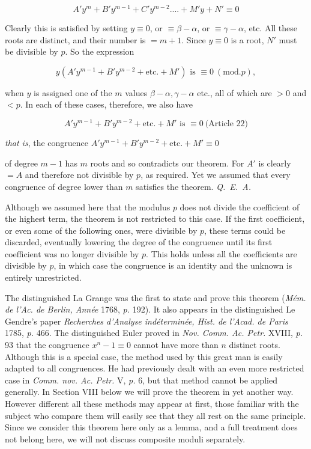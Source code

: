 \[A'y^m+B'y^{m-1}+C'y^{m-2}....+M'y+N'\equiv0\]

Clearly this is satisfied by setting $y\equiv0$, or $\equiv\beta-\alpha$, or $\equiv\gamma-\alpha$, etc. All these roots are distinct, and their number is $=m+1$. Since $y\equiv0$ is a root, $N'$ must be divisible by $p$. So the expression

\[y(A'y^{m-1}+B'y^{m-2}+\text{etc.}+M')\text{ is }\equiv0\ (\mathrm{mod.}p),\]

\noindent when $y$ is assigned one of the $m$ values $\beta-\alpha,\gamma-\alpha$ etc., all of which are $>0$ and $<p$. In each of these cases, therefore, we also have

\[A'y^{m-1}+B'y^{m-2}+\text{etc.}+M'\text{ is }\equiv0\ \text{(Article 22)}\]

\noindent\emph{that is}, the congruence \qquad $A'y^{m-1}+B'y^{m-2}+\text{etc.}+M'\equiv0$

\noindent of degree $m-1$ has $m$ roots and so contradicts our theorem. For $A'$ is clearly $=A$ and therefore not divisible by $p$, as required. Yet we assumed that every congruence of degree lower than $m$ satisfies the theorem. \mbox{\emph{Q. E. A.}}



Although we assumed here that the modulus $p$ does not divide the coefficient of the highest term, the theorem is not restricted to this case. If the first coefficient, or even some of the following ones, were divisible by $p$, these terms could be discarded, eventually lowering the degree of the congruence until its first coefficient was no longer divisible by $p$. This holds unless all the coefficients are divisible by $p$, in which case the congruence is an identity and the unknown is entirely unrestricted.

The distinguished La Grange was the first to state and prove this theorem (\emph{M\'em. de l'Ac. de Berlin, Ann\'ee} 1768, \emph{p.} 192). It also appears in the distinguished Le Gendre's paper \emph{Recherches d'Analyse ind\'etermin\'ee, Hist. de l'Acad. de Paris} 1785, \emph{p.} 466. The distinguished Euler proved in \emph{Nov. Comm. Ac. Petr.} XVIII, \emph{p.} 93 that the congruence $x^n-1\equiv0$ cannot have more than $n$ distinct roots. Although this is a special case, the method used by this great man is easily adapted to all congruences. He had previously dealt with an even more restricted case in \emph{Comm. nov. Ac. Petr.} V, \emph{p.} 6, but that method cannot be applied generally. In Section VIII below we will prove the theorem in yet another way. However different all these methods may appear at first, those familiar with the subject who compare them will easily see that they all rest on the same principle. Since we consider this theorem here only as a lemma, and a full treatment does not belong here, we will not discuss composite moduli separately.

